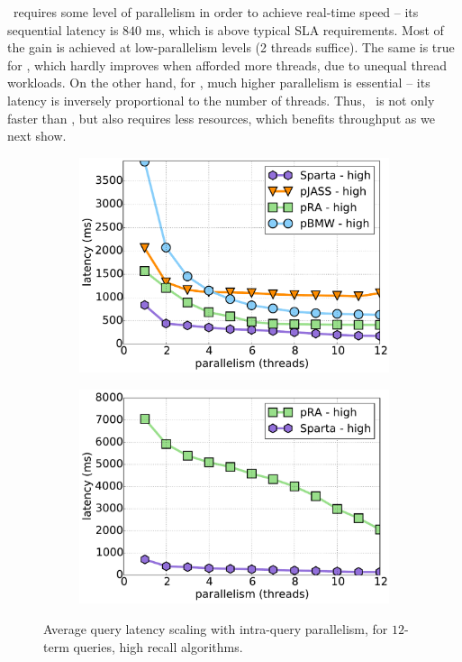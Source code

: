 {{\alg\ requires some level of parallelism in order to achieve real-time speed -- its sequential latency is $840$ ms, which is  above typical SLA requirements. Most of the gain is achieved at low-parallelism levels (2 threads suffice). 
The same is true for \pJASS, which hardly improves when afforded more threads, due to unequal thread workloads.
On the other hand, for \pBMW, much higher parallelism is essential -- its latency is inversely proportional to the number of threads. Thus, \alg\ is not only faster 
than \pBMW, but also requires less resources, which benefits throughput as we next show.

\begin{figure}[tbh]
\centering
      \begin{subfigure}[t]{0.4\textwidth}
         \includegraphics[width=\textwidth]{figures/latency_12terms_clueweb.pdf}
        \caption{\cw}
      \end{subfigure} %
\hfill %
      \begin{subfigure}[t]{0.4\textwidth}
      \includegraphics[width=\textwidth]{figures/latency_12terms_cluewebX10.pdf}
	  \caption{\cwten}
      \end{subfigure}
\caption{Average query latency scaling with intra-query parallelism, for $12$-term queries, high recall algorithms.}
\label{fig:threads-scaling}
\end{figure}

}}
